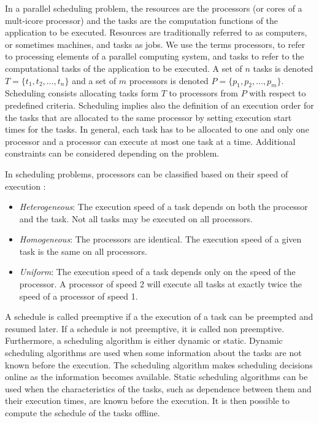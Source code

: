 In a parallel scheduling problem, the resources are the processors (or cores of a mult-icore processor) and the tasks are the computation functions of the application to be executed. Resources are traditionally referred to as computers, or sometimes machines, and tasks as jobs. We use the terms processors, to refer to processing elements of a parallel computing system, and tasks to refer to the computational tasks of the application to be executed. A set of $n$ tasks is denoted $T = \{t_1, t_2, \ldots, t_n\}$ and a set of $m$ processors is denoted $P = \{p_1, p_2, \ldots, p_m\}$. Scheduling consists allocating tasks form $T$ to processors from $P$ with respect to predefined criteria. Scheduling implies also the definition of an execution order for the tasks that are allocated to the same processor by setting execution start times for the tasks. In general, each task has to be allocated to one and only one processor and a processor can execute at most one task at a time. Additional constraints can be considered depending on the problem.

In scheduling problems, processors can be classified based on their speed of execution \cite{davis:2011}:

\begin{itemize}
\item \textit{Heterogeneous}: The execution speed of a task depends on both the processor and the task. Not all tasks may be executed on all processors.
\item \textit{Homogeneous}: The processors are identical. The execution speed of a given task is the same on all processors.
\item \textit{Uniform}: The execution speed of a task depends only on the speed of the processor. A processor of speed 2 will execute all tasks at exactly twice the speed of a processor of speed 1.
\end{itemize}

A schedule is called preemptive if a the execution of a task can be preempted and resumed later. If a schedule is not preemptive, it is called non preemptive. Furthermore, a scheduling algorithm is either dynamic or static. Dynamic scheduling algorithms are used when some information about the tasks are not known before the execution. The scheduling algorithm makes scheduling decisions online as the information becomes available. Static scheduling algorithms can be used when the characteristics of the tasks, such as dependence between them and their execution times, are known before the execution. It is then possible to compute the schedule of the tasks offline.


